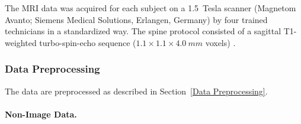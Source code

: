 \documentclass[journal]{style/vgtc} 			          %
\begin{document}
The MRI data was acquired for each subject on a 1.5~Tesla scanner (Magnetom Avanto; Siemens Medical Solutions, Erlangen, Germany) by four trained technicians in a standardized way.
%
The spine protocol consisted of a sagittal T1-weighted turbo-spin-echo sequence ($1.1\times1.1\times4.0~mm$ voxels) \cite{Hegenscheid2013}. %

\subsubsection{Data Preprocessing} \label{application:Data Preprocessing}
The data are preprocessed as described in Section~\ref{Data Preprocessing}.
%
\paragraph{Non-Image Data.} 
\end{document}
